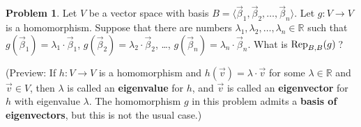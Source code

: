\documentclass[11pt]{article}
\newcommand{\R}{{\mathbb R}}
\theoremstyle{definition}
\newtheorem{problem}{Problem}
\newenvironment{answer}{\par\bigskip\bgroup\color{darkblue}}{\egroup}
\begin{document}
\begin{answer}
\end{answer}




\begin{problem}
Let $V$ be a vector space with basis $B=\langle \vec\beta_1,\vec\beta_2,\dots,\vec\beta_n \rangle$.
Let $g\colon V\to V$ is a homomorphism.  Suppose that there are numbers 
$\lambda_1,\lambda_2,\dots,\lambda_n\in\R$ such that $g(\vec\beta_1)=\lambda_1\cdot\vec\beta_1$,
$g(\vec\beta_2)=\lambda_2\cdot\vec\beta_2$, \dots, $g(\vec\beta_n)=\lambda_n\cdot\vec\beta_n$.
What is ${\rm Rep}_{B,B}(g)\,$?

(Preview:  If $h\colon V\to V$ is a homomorphism and $h(\vec v) = \lambda\cdot\vec v$ for
some $\lambda\in\R$ and $\vec v\in V$, then $\lambda$ is called an \textbf{eigenvalue} for $h$,
and $\vec v$ is called an \textbf{eigenvector} for $h$ with eigenvalue $\lambda$.  The homomorphism
$g$ in this problem admits a \textbf{basis of eigenvectors}, but this is not the usual case.)
\end{problem}

\begin{answer}
\end{answer}
\end{document}
